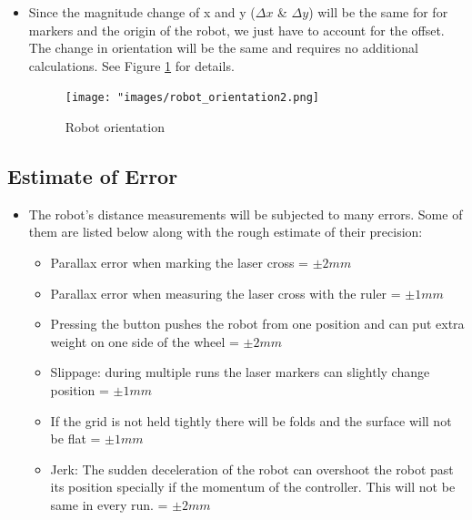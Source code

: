 \begin{itemize}
            \item Since the magnitude change of x and y ($\Delta x$  \& $\Delta y$) will be the same for for markers and the origin of the robot, we just have to account for the offset. The change in orientation will be the same and requires no additional calculations. See Figure \ref{fig:Robot orientation} for details.
            
            
            \begin{figure}[!ht] 
                        \centering \texttt{[image: "images/robot\_orientation2.png]}
                        \caption{Robot orientation}
                        \label{fig:Robot orientation}
                 \end{figure}
            
            
        \end{itemize}
        
        
                
    
    {
    \subsection{Estimate of Error}
    
        \begin{itemize}
            \item The robot's distance measurements will be subjected to many errors. Some of them are listed below along with the rough estimate of their precision:
            
            \begin{itemize}
                \item[1.] Parallax error when marking the laser cross =  $\pm 2mm$
                
                \item[2.] Parallax error when measuring the laser cross with the ruler = $\pm 1mm$
                
                \item[3.] Pressing the button pushes the robot from one position and can put extra weight on one side of the wheel = $\pm 2mm$
                
                \item[4.] Slippage: during multiple runs the laser markers can slightly change position = $\pm 1mm$
                
                \item[5.] If the grid is not held tightly there will be folds and the surface will not be flat = $\pm 1mm$
                
                \item[6.] Jerk: The sudden deceleration of the robot can overshoot the robot past its position specially if the momentum of the controller. This will not be same in every run. = $\pm 2mm$ 
            \end{itemize}
            
        \end{itemize}
    
    
    
    
    
    }
    
